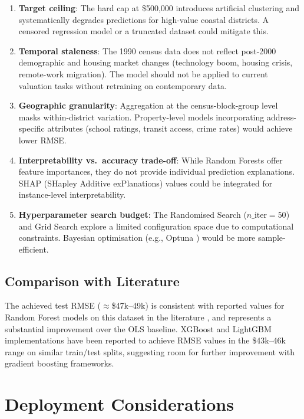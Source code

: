 \documentclass[conference]{IEEEtran}
\begin{document}
\begin{enumerate}
    \item \textbf{Target ceiling}: The hard cap at \$500,000 introduces artificial clustering and systematically degrades predictions for high-value coastal districts. A censored regression model or a truncated dataset could mitigate this.
    \item \textbf{Temporal staleness}: The 1990 census data does not reflect post-2000 demographic and housing market changes (technology boom, housing crisis, remote-work migration). The model should not be applied to current valuation tasks without retraining on contemporary data.
    \item \textbf{Geographic granularity}: Aggregation at the census-block-group level masks within-district variation. Property-level models incorporating address-specific attributes (school ratings, transit access, crime rates) would achieve lower RMSE.
    \item \textbf{Interpretability vs.\ accuracy trade-off}: While Random Forests offer feature importances, they do not provide individual prediction explanations. SHAP (SHapley Additive exPlanations) \cite{lundberg2017shap} values could be integrated for instance-level interpretability.
    \item \textbf{Hyperparameter search budget}: The Randomised Search ($n\_\text{iter} = 50$) and Grid Search explore a limited configuration space due to computational constraints. Bayesian optimisation (e.g., Optuna \cite{akiba2019optuna}) would be more sample-efficient.
\end{enumerate}

\subsection{Comparison with Literature}

The achieved test RMSE ($\approx$\$47k–49k) is consistent with reported values for Random Forest models on this dataset in the literature \cite{geron2019}, and represents a substantial improvement over the OLS baseline. XGBoost and LightGBM implementations have been reported to achieve RMSE values in the \$43k–46k range on similar train/test splits, suggesting room for further improvement with gradient boosting frameworks.

\section{Deployment Considerations}
\label{sec:deployment}
\end{document}
